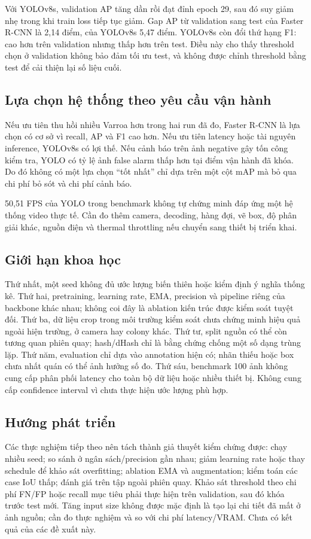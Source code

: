 \documentclass[a4paper,10pt,twocolumn]{article}
\newcommand{\FR}{Faster R-CNN}
\newcommand{\YO}{YOLOv8s}
\begin{document}
Với \YO{}, validation AP tăng dần rồi đạt đỉnh epoch 29, sau đó suy giảm nhẹ trong
khi train loss tiếp tục giảm. Gap AP từ validation sang test của \FR{} là 2,14 điểm,
của \YO{} 5,47 điểm. \YO{} còn đổi thứ hạng F1: cao hơn trên validation nhưng thấp
hơn trên test. Điều này cho thấy threshold chọn ở validation không bảo đảm tối ưu
test, và không được chỉnh threshold bằng test để cải thiện lại số liệu cuối.

\subsection{Lựa chọn hệ thống theo yêu cầu vận hành}
Nếu ưu tiên thu hồi nhiều Varroa hơn trong hai run đã đo, \FR{} là lựa chọn có cơ sở
vì recall, AP và F1 cao hơn. Nếu ưu tiên latency hoặc tài nguyên inference, \YO{}
có lợi thế. Nếu cảnh báo trên ảnh negative gây tốn công kiểm tra, YOLO có tỷ lệ ảnh
false alarm thấp hơn tại điểm vận hành đã khóa. Do đó không có một lựa chọn ``tốt
nhất'' chỉ dựa trên một cột mAP mà bỏ qua chi phí bỏ sót và chi phí cảnh báo.

50,51 FPS của YOLO trong benchmark không tự chứng minh đáp ứng một hệ thống video
thực tế. Cần đo thêm camera, decoding, hàng đợi, vẽ box, độ phân giải khác, nguồn
điện và thermal throttling nếu chuyển sang thiết bị triển khai.

\subsection{Giới hạn khoa học}
Thứ nhất, một seed không đủ ước lượng biến thiên hoặc kiểm định ý nghĩa thống kê.
Thứ hai, pretraining, learning rate, EMA, precision và pipeline riêng của backbone
khác nhau; không coi đây là ablation kiến trúc được kiểm soát tuyệt đối.
Thứ ba, dữ liệu crop trong môi trường kiểm soát chưa chứng minh hiệu quả ngoài hiện
trường, ở camera hay colony khác. Thứ tư, split nguồn có thể còn tương quan phiên quay;
hash/dHash chỉ là bằng chứng chống một số dạng trùng lặp. Thứ năm, evaluation chỉ
dựa vào annotation hiện có; nhãn thiếu hoặc box chưa nhất quán có thể ảnh hưởng số đo.
Thứ sáu, benchmark 100 ảnh không cung cấp phân phối latency cho toàn bộ dữ liệu hoặc
nhiều thiết bị. Không cung cấp confidence interval vì chưa thực hiện ước lượng phù hợp.

\subsection{Hướng phát triển}
Các thực nghiệm tiếp theo nên tách thành giả thuyết kiểm chứng được: chạy nhiều seed;
so sánh ở ngân sách/precision gần nhau; giảm learning rate hoặc thay schedule để
khảo sát overfitting; ablation EMA và augmentation; kiểm toán các case IoU thấp;
đánh giá trên tập ngoài phiên quay. Khảo sát threshold theo chi phí FN/FP hoặc
recall mục tiêu phải thực hiện trên validation, sau đó khóa trước test mới.
Tăng input size không được mặc định là tạo lại chi tiết đã mất ở ảnh nguồn; cần
đo thực nghiệm và so với chi phí latency/VRAM. Chưa có kết quả của các đề xuất này.
\end{document}
